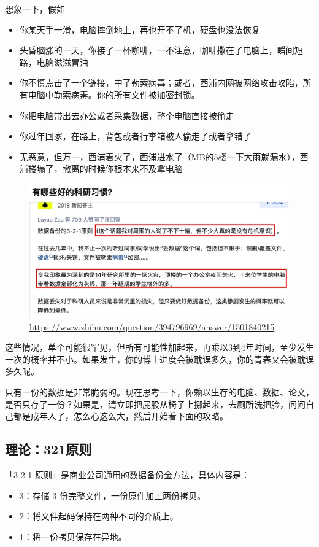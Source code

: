 想象一下，假如
\begin{itemize}
    \item 你某天手一滑，电脑摔倒地上，再也开不了机，硬盘也没法恢复
    \item 头昏脑涨的一天，你接了一杯咖啡，一不注意，咖啡撒在了电脑上，瞬间短路，电脑滋滋冒油
    \item 你不慎点击了一个链接，中了勒索病毒；或者，西浦内网被网络攻击攻陷，所有电脑中勒索病毒。你的所有文件被加密封锁。
    \item 你把电脑带出去办公或者采集数据，整个电脑直接被偷走
    \item 你过年回家，在路上，背包或者行李箱被人偷走了或者拿错了
    \item 无恶意，但万一，西浦着火了，西浦进水了（MB的5楼一下大雨就漏水），西浦楼塌了，撤离的时候你根本来不及拿电脑
\end{itemize}


\begin{figure}[H]
    \centering
    \includegraphics[width=0.8\columnwidth]{author-folder/Kai.Wu/backup_zhihu.jpg}
    \caption{\url{https://www.zhihu.com/question/394796969/answer/1501840215}}
\end{figure}

这些情况，单个可能很罕见，但所有可能性加起来，再乘以3到4年时间，至少发生一次的概率并不小。如果发生，你的博士进度会被耽误多久，你的青春又会被耽误多久呢。

只有一份的数据是非常脆弱的。现在思考一下，你赖以生存的电脑、数据、论文，是否只存了一份？如果是，请立即把屁股从椅子上挪起来，去厕所洗把脸，问问自己都是成年人了，怎么心这么大，然后开始看下面的攻略。

\subsection{理论：321原则}

「3-2-1 原则」是商业公司通用的数据备份金方法，具体内容是：
\begin{itemize}
    \item 3：存储 3 份完整文件，一份原件加上两份拷贝。
    \item 2：将文件起码保持在两种不同的介质上。
    \item 1：将一份拷贝保存在异地。
\end{itemize}

